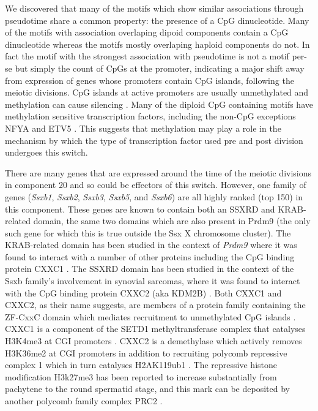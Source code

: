 We discovered that many of the motifs which show similar associations through pseudotime share a common property: the presence of a CpG dinucleotide. Many of the motifs with association overlaping dipoid components contain a CpG dinucleotide whereas the motifs mostly overlaping haploid components do not. In fact the motif with the strongest association with pseudotime is not a motif per-se but simply the count of CpGs at the promoter, indicating a major shift away from expression of genes whose promoters contain CpG islands, following the meiotic divisions. CpG islands at active promoters are usually unmethylated and methylation can cause silencing \parencite{Li2014DNA}. Many of the diploid CpG containing motifs have methylation sensitive transcription factors, including the non-CpG exceptions NFYA and ETV5 \parencite{Domcke2015Competition, Wang2017NRF1}. This suggests that methylation may play a role in the mechanism by which the type of transcription factor used pre and post division undergoes this switch.

\label{sec:ssx}
There are many genes that are expressed around the time of the meiotic divisions in component 20 and so could be effectors of this switch. However, one family of genes (\textit{Ssxb1}, \textit{Ssxb2}, \textit{Ssxb3}, \textit{Ssxb5}, and \textit{Ssxb6}) are all highly ranked (top 150) in this component. These genes are known to contain both an SSXRD and KRAB-related domain, the same two domains which are also present in Prdm9 (the only such gene for which this is true outside the Ssx X chromosome cluster). The KRAB-related domain has been studied in the context of \textit{Prdm9} where it was found to interact with a number of other proteins including the CpG binding protein CXXC1 \parencite{Imai2017PRDM9, Parvanov2017PRDM9}. The SSXRD domain has been studied in the context of the Ssxb family's involvement in synovial sarcomas, where it was found to interact with the CpG binding protein CXXC2 (aka KDM2B) \parencite{Banito2018SS18SSX}. Both CXXC1 and CXXC2, as their name suggests, are members of a protein family containing the ZF-CxxC domain which mediates recruitment to unmethylated CpG islands \parencite[reviewed in][]{Long2013ZFCxxC}. CXXC1 is a component of the SETD1 methyltransferase complex that catalyses H3K4me3 at CGI promoters \parencite{Lee2005CpGbinding}. CXXC2 is a demethylase which actively removes H3K36me2 at CGI promoters in addition to recruiting polycomb repressive complex 1 which in turn catalyses H2AK119ub1 \parencite{He2008H3K36, Farcas2012KDM2B, He2013Kdm2b, Wu2013Fbxl10}. The repressive histone modification H3k27me3 has been reported to increase substantially from pachytene to the round spermatid stage, and this mark can be deposited by another polycomb family complex PRC2 \parencite{Sin2015Poised}.


